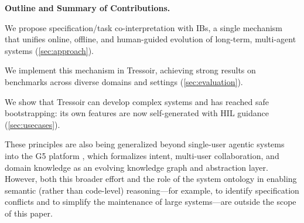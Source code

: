 \textbf{Outline and Summary of Contributions.}
\squishlist
\item We propose specification/task co-interpretation with IBs, a single mechanism that unifies online, offline, and human-guided evolution of long-term, multi-agent systems (\cref{sec:approach}).
\item We implement this mechanism in Tressoir, achieving strong results on benchmarks across diverse domains and settings (\cref{sec:evaluation}).
\item We show that Tressoir can develop complex systems and has reached safe bootstrapping: its own features are now self-generated with HIL guidance (\cref{sec:usecases}).
\squishend

These principles are also being generalized beyond single-user agentic systems into the G5 platform \cite{G5}, which formalizes intent, multi-user collaboration, and domain knowledge as an evolving knowledge graph and abstraction layer. However, both this broader effort and the role of the system ontology in enabling semantic (rather than code-level) reasoning—for example, to identify specification conflicts and to simplify the maintenance of large systems—are outside the scope of this paper.





